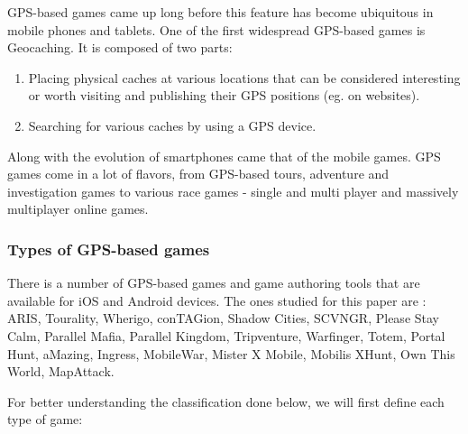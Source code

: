 \documentclass{article}
\begin{document}
GPS-based games came up long before this feature has become ubiquitous in mobile
phones and tablets. One of the first widespread GPS-based games is Geocaching.
It is composed of two parts: 
\begin{enumerate}
  \item Placing physical caches at various locations that can be considered
  interesting or worth visiting and publishing their GPS positions (eg. on
  websites).
  \item Searching for various caches by using a GPS device.
\end{enumerate}

Along with the evolution of smartphones came that of the mobile games. GPS games
come in a lot of flavors, from GPS-based tours, adventure and investigation
games to various race games - single and multi player and massively multiplayer
online games.


\subsubsection{Types of GPS-based games}

There is a number of GPS-based games and game authoring tools that are
available for iOS and Android devices. The ones studied for this paper are :
ARIS, Tourality, Wherigo, conTAGion, Shadow Cities, SCVNGR, Please Stay Calm,
Parallel Mafia, Parallel Kingdom, Tripventure, Warfinger, Totem, Portal Hunt,
aMazing, Ingress, MobileWar, Mister X Mobile, Mobilis XHunt, Own This World,
MapAttack.\newline

For better understanding the classification done below, we will first define
each type of game:
\end{document}
